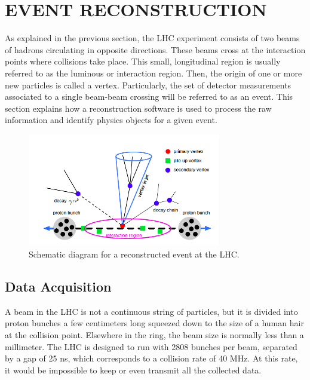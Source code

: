 %
%
%
%



\chapter{EVENT RECONSTRUCTION \label{cha:eventreco}}
As explained in the previous section, the LHC experiment consists of two beams of hadrons circulating in opposite directions. These beams cross at the interaction points where collisions take place. This small, longitudinal region is usually referred to as the luminous or interaction region. Then, the origin of one or more new particles is called a vertex. Particularly, the set of detector measurements associated to a single beam-beam crossing will be referred to as an event. This section explains how a reconstruction software is used to process the raw information and identify physics objects for a given event. 

 \begin{figure}[H]
 	\centering
 	\includegraphics[width=0.75\textwidth]{figures/eventvertex.png}
 	\singlespace
 	\caption{Schematic diagram for a reconstructed event at the LHC.}
 	\label{fig:vertex}
 \end{figure}


\section{Data Acquisition}
A beam in the LHC is not a continuous string of particles, but it is divided into proton bunches a few centimeters long squeezed down to the size of a human hair at the collision point. Elsewhere in the ring, the beam size is normally less than a millimeter. The LHC is designed to run with 2808 bunches per beam, separated by a gap of 25 ns, which corresponds to a collision rate of 40 MHz. At this rate, it would be impossible to keep or even transmit all the collected data.

